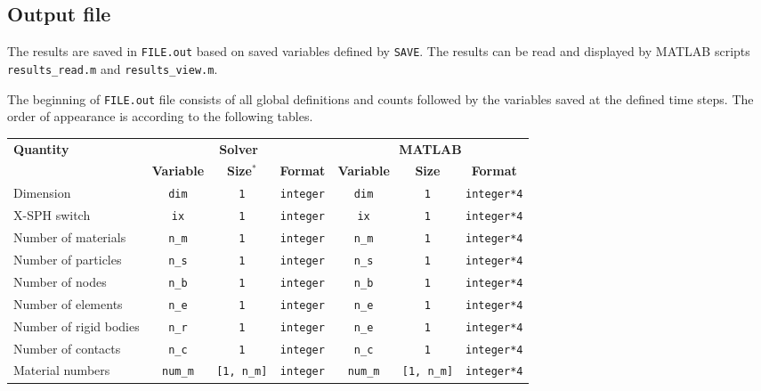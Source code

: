 \subsection{Output file}

The results are saved in \texttt{FILE.out} based on saved variables defined by \texttt{SAVE}. The results can be read and displayed by MATLAB scripts \texttt{results\_read.m} and \texttt{results\_view.m}.

The beginning of \texttt{FILE.out} file consists of all global definitions and counts followed by the variables saved at the defined time steps. The order of appearance is according to the following tables.

{\footnotesize
\begin{tabular}{|l|c|c|c|c|c|c|}%
\hline
\multirow{2}{*}{\bf Quantity} & \multicolumn{3}{c|}{\bf Solver} &\multicolumn{3}{c|}{\bf MATLAB} \\ \cline{2-7}
& {\bf Variable} & {\bf Size}$^*$ & {\bf Format} & {\bf Variable} & {\bf Size} & {\bf Format} \\ \hline
Dimension & \texttt{dim} & \texttt{1} & \texttt{integer} & \texttt{dim} & \texttt{1} & \texttt{integer*4} \\ \hline
X-SPH switch & \texttt{ix} & \texttt{1} & \texttt{integer} & \texttt{ix} & \texttt{1} & \texttt{integer*4} \\ \hline
Number of materials & \texttt{n\_m} & \texttt{1} & \texttt{integer} & \texttt{n\_m} & \texttt{1} & \texttt{integer*4} \\ \hline
Number of particles & \texttt{n\_s} & \texttt{1} & \texttt{integer} & \texttt{n\_s} & \texttt{1} & \texttt{integer*4} \\ \hline
Number of nodes & \texttt{n\_b} & \texttt{1} & \texttt{integer} & \texttt{n\_b} & \texttt{1} & \texttt{integer*4} \\ \hline
Number of elements & \texttt{n\_e} & \texttt{1} & \texttt{integer} & \texttt{n\_e} & \texttt{1} & \texttt{integer*4} \\ \hline
Number of rigid bodies & \texttt{n\_r} & \texttt{1} & \texttt{integer} & \texttt{n\_e} & \texttt{1} & \texttt{integer*4} \\ \hline
Number of contacts & \texttt{n\_c} & \texttt{1} & \texttt{integer} & \texttt{n\_c} & \texttt{1} & \texttt{integer*4} \\ \hline
Material numbers & \texttt{num\_m} & \texttt{[1, n\_m]} & \texttt{integer} & \texttt{num\_m} & \texttt{[1, n\_m]} & \texttt{integer*4} \\ \hline

\end{tabular}}
